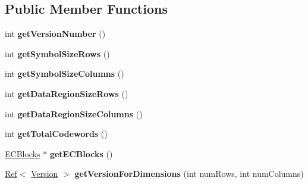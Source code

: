 \subsection*{Public Member Functions}
\begin{DoxyCompactItemize}
\item 
\mbox{\label{classzxing_1_1datamatrix_1_1_version_aaf2adda7a0f502a018c7eae443cd90be}} 
int {\bfseries get\+Version\+Number} ()
\item 
\mbox{\label{classzxing_1_1datamatrix_1_1_version_a1c58be29a29f19d1a987adfc579dc982}} 
int {\bfseries get\+Symbol\+Size\+Rows} ()
\item 
\mbox{\label{classzxing_1_1datamatrix_1_1_version_a29fc7ec155fa2a19e25415c395abae31}} 
int {\bfseries get\+Symbol\+Size\+Columns} ()
\item 
\mbox{\label{classzxing_1_1datamatrix_1_1_version_a98ec783d8829a71342556aaa9ed1ab0d}} 
int {\bfseries get\+Data\+Region\+Size\+Rows} ()
\item 
\mbox{\label{classzxing_1_1datamatrix_1_1_version_a679a8879584e8e09f215d2159d72723f}} 
int {\bfseries get\+Data\+Region\+Size\+Columns} ()
\item 
\mbox{\label{classzxing_1_1datamatrix_1_1_version_af020b34e0117116948f9830284d8d69b}} 
int {\bfseries get\+Total\+Codewords} ()
\item 
\mbox{\label{classzxing_1_1datamatrix_1_1_version_a4f0b65d04c1a81a82ce4f39dc18e4e4e}} 
\mbox{\hyperlink{classzxing_1_1datamatrix_1_1_e_c_blocks}{E\+C\+Blocks}} $\ast$ {\bfseries get\+E\+C\+Blocks} ()
\item 
\mbox{\label{classzxing_1_1datamatrix_1_1_version_a237b723a7aa52c9dced65e629ba1e479}} 
\mbox{\hyperlink{classzxing_1_1_ref}{Ref}}$<$ \mbox{\hyperlink{classzxing_1_1datamatrix_1_1_version}{Version}} $>$ {\bfseries get\+Version\+For\+Dimensions} (int num\+Rows, int num\+Columns)
\end{DoxyCompactItemize}
